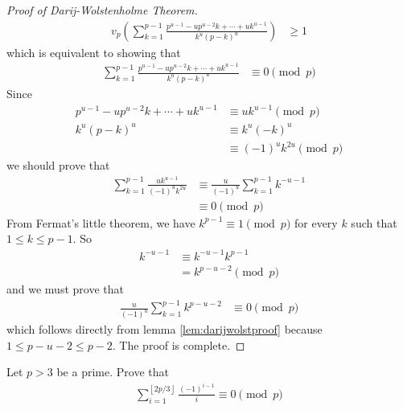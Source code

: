\documentclass{subfile}
\begin{document}
\begin{proof}[Proof of Darij-Wolstenholme Theorem]
\begin{align*}
			v_{p}\left(\sum_{k = 1}^{p - 1}\frac {p^{u - 1} - up^{u - 2}k+\cdots + uk^{u - 1}}{k^{u}\left(p - k\right)^{u}}\right)
				& \geq 1
		\end{align*}
		which is equivalent to showing that
		\begin{align*}
			\sum_{k = 1}^{p - 1}\frac {p^{u - 1} - up^{u - 2}k+\cdots + uk^{u - 1}}{k^{u}\left(p - k\right)^{u}}
				& \equiv 0 \pmod p
		\end{align*}
		Since
			\begin{align*}
				p^{u - 1} - up^{u - 2}k+\cdots + uk^{u - 1}
					& \equiv uk^{u - 1} \pmod p\\
				k^{u}\left(p - k\right)^{u}
					& \equiv k^{u}\left(-k\right)^{u}\\
					& \equiv (-1)^u k^{2u} \pmod p
			\end{align*}
		we should prove that
			\begin{align*}
				\sum_{k = 1}^{p - 1}\frac {uk^{u - 1}}{\left( - 1\right)^{u}k^{2u}}
					& \equiv\frac {u}{\left( - 1\right)^{u}}\sum_{k = 1}^{p - 1}k^{ - u - 1}\\
					& \equiv 0 \pmod p
			\end{align*}
		From Fermat's little theorem, we have $k^{p-1} \equiv 1 \pmod p$ for every $k$ such that $1 \leq k \leq p-1$. So
			\begin{align*}
				k^{ - u - 1}
					& \equiv k^{ - u - 1}k^{p - 1}\\
					& = k^{p - u - 2}\pmod p
			\end{align*}
		and we must prove that
			\begin{align*}
				\frac {u}{\left( - 1\right)^{u}}\sum_{k = 1}^{p - 1}k^{p - u - 2}
					& \equiv 0 \pmod p
			\end{align*}
		which follows directly from lemma \eqref{lem:darijwolstproof} because $ 1\leq p - u - 2\leq p - 2$. The proof is complete.
	\end{proof}

	\begin{problem}
		Let $p>3$ be a prime. Prove that
		\begin{align*}
			\sum_{i = 1}^{\left\lfloor 2p/3\right\rfloor}\frac {\left( - 1\right)^{i - 1}}{i} \equiv 0 \pmod p
		\end{align*}
	\end{problem}
\end{document}
